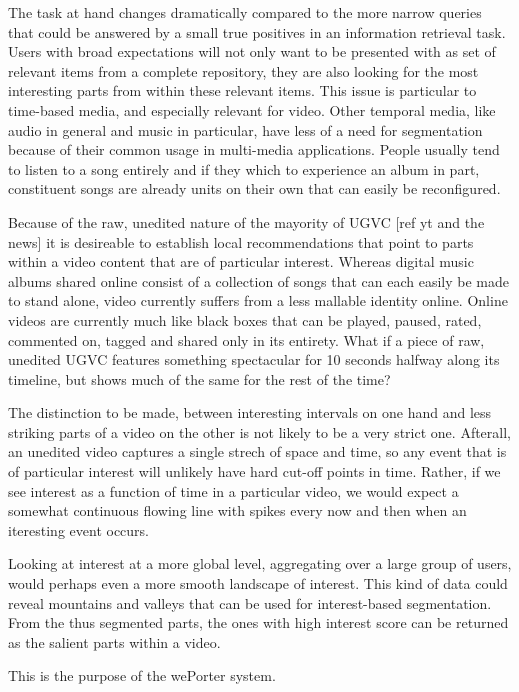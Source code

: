 The task at hand changes dramatically compared to the more narrow queries that could be answered by a small true positives in an information retrieval task. Users with broad expectations will not only want to be presented with as set of relevant items from a complete repository, they are also looking for the most interesting parts from within these relevant items. This issue is particular to time-based media, and especially relevant for video. Other temporal media, like audio in general and music in particular, have less of a need for segmentation because of  their common usage in multi-media applications. People usually tend to listen to a song entirely and if they which to experience an album in part, constituent songs are already units on their own that can easily be reconfigured.

Because of the raw, unedited nature of the mayority of UGVC [ref yt and the news] it is desireable to establish local recommendations that point to parts within a video content that are of particular interest. Whereas digital music albums shared online consist of a collection of songs that can each easily be made to stand alone, video currently suffers from a less mallable identity online.  Online videos are currently much like black boxes that can be played, paused, rated, commented on, tagged and shared only in its entirety. What if a piece of raw, unedited UGVC features something spectacular for 10 seconds halfway along its timeline, but shows much of the same for the rest of the time?

The distinction to be made, between interesting intervals on one hand and less striking parts of a video on the other is not likely to be a very strict one. Afterall, an unedited video captures a single strech of space and time, so any event that is of particular interest will unlikely have hard cut-off points in time. Rather, if we see interest as a function of time in a particular video, we would expect a somewhat continuous flowing line with spikes every now and then when an iteresting event occurs. 

Looking at interest at a more global level, aggregating over a large group of users, would perhaps even a more smooth landscape of interest. This kind of data could reveal mountains and valleys that can be used for interest-based segmentation. From the thus segmented parts, the ones with high interest score can be returned as the salient parts within a video.


This is the purpose of the wePorter system.




